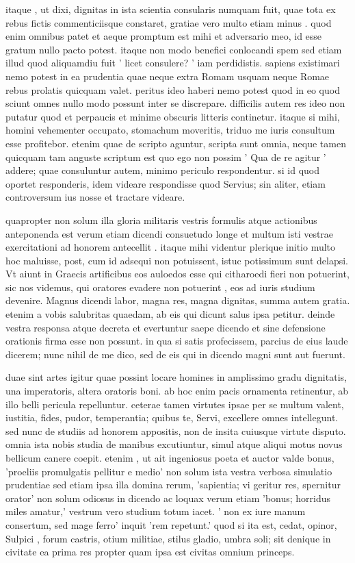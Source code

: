 itaque , ut dixi, dignitas in ista scientia consularis numquam fuit, quae tota ex rebus fictis commenticiisque constaret, gratiae vero multo etiam minus . quod enim omnibus patet et aeque promptum est mihi et adversario meo, id esse gratum nullo pacto potest. itaque non modo benefici conlocandi spem sed etiam illud quod aliquamdiu fuit ' licet consulere? ' iam perdidistis. sapiens existimari nemo potest in ea prudentia quae neque extra Romam usquam neque Romae rebus prolatis quicquam valet. peritus ideo haberi nemo potest quod in eo quod sciunt omnes nullo modo possunt inter se discrepare. difficilis autem res ideo non putatur quod et perpaucis et minime obscuris litteris continetur. itaque si mihi, homini vehementer occupato, stomachum moveritis, triduo me iuris consultum esse profitebor. etenim quae de scripto aguntur, scripta sunt omnia, neque tamen quicquam tam anguste scriptum est quo ego non possim ' Qua de re agitur ' addere; quae consuluntur autem, minimo periculo respondentur. si id quod oportet responderis, idem videare respondisse quod Servius; sin aliter, etiam controversum ius nosse et tractare videare.

 quapropter non solum illa gloria militaris vestris formulis atque actionibus anteponenda est verum etiam dicendi consuetudo longe et multum isti vestrae exercitationi ad honorem antecellit . itaque mihi videntur plerique initio multo hoc maluisse, post, cum id adsequi non potuissent, istuc potissimum sunt delapsi. Vt aiunt in Graecis artificibus eos auloedos esse qui citharoedi fieri non potuerint, sic nos videmus, qui oratores evadere non potuerint , eos ad iuris studium devenire. Magnus dicendi labor, magna res, magna dignitas, summa autem gratia. etenim a vobis salubritas quaedam, ab eis qui dicunt salus ipsa petitur. deinde vestra responsa atque decreta et evertuntur saepe dicendo et sine defensione orationis firma esse non possunt. in qua si satis profecissem, parcius de eius laude dicerem; nunc nihil de me dico, sed de eis qui in dicendo magni sunt aut fuerunt.

 duae sint artes igitur quae possint locare homines in amplissimo gradu dignitatis, una imperatoris, altera oratoris boni. ab hoc enim pacis ornamenta retinentur, ab illo belli pericula repelluntur. ceterae tamen virtutes ipsae per se multum valent, iustitia, fides, pudor, temperantia; quibus te, Servi, excellere omnes intellegunt. sed nunc de studiis ad honorem appositis, non de insita cuiusque virtute disputo. omnia ista nobis studia de manibus excutiuntur, simul atque aliqui motus novus bellicum canere coepit. etenim , ut ait ingeniosus poeta et auctor valde bonus, 'proeliis promulgatis pellitur e medio' non solum ista vestra verbosa simulatio prudentiae sed etiam ipsa illa domina rerum, 'sapientia; vi geritur res, spernitur orator' non solum odiosus in dicendo ac loquax verum etiam 'bonus; horridus miles amatur,' vestrum vero studium totum iacet. ' non ex iure manum consertum, sed mage ferro' inquit 'rem repetunt.' quod si ita est, cedat, opinor, Sulpici , forum castris, otium militiae, stilus gladio, umbra soli; sit denique in civitate ea prima res propter quam ipsa est civitas omnium princeps.

